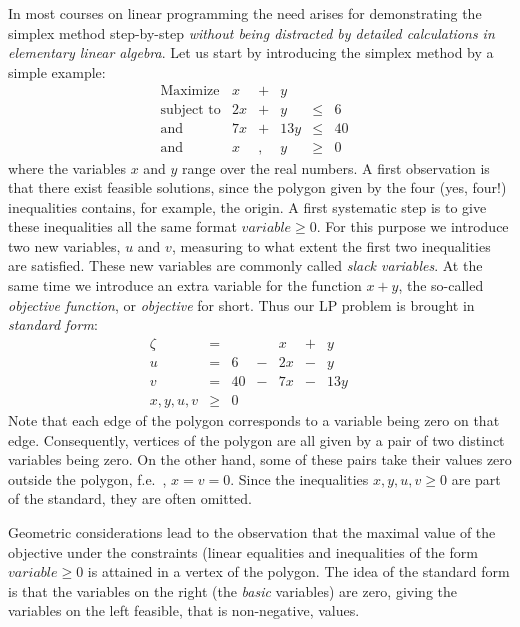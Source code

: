 \documentclass[ukenglish]{nik}
\begin{document}
In most courses on linear programming the need arises for demonstrating the simplex method step-by-step 
\emph{without being distracted by detailed calculations in elementary linear algebra}. Let us start by
introducing the simplex method by a simple example:
\[
    \begin{array}{llcrcrcrcrcrcr}
    \text{Maximize}  &    x &+&    y \\
    \text{subject to}&  2 x &+&    y &\leq&   6\\
    \text{and}&         7 x &+& 13 y &\leq&  40\\
    \text{and}       &    x &,&    y &\geq&0    &
    \end{array}
\]
where the variables $x$ and $y$ range over the real numbers.
A first observation is that there exist feasible solutions,
since the polygon given by the four (yes, four!) inequalities contains,
for example, the origin. A first systematic step is to give these inequalities
all the same format $\mathit{variable}\geq 0$. For this purpose we introduce
two new variables, $u$ and $v$, measuring to what extent the first
two inequalities are satisfied. These new variables are commonly called
\emph{slack variables}. At the same time we introduce an extra variable
for the function $x+y$, the so-called \emph{objective function},
or \emph{objective} for short. Thus our LP problem is brought in
\emph{standard form}:
\[    
    \begin{array}{lcrcrcrcr}
      \zeta&=&   & &     x &+&     y & &  \\\hline
      u    &=& 6 &-&   2 x &-&     y & &  \\
      v    &=& 40&-&   7 x &-&  13 y & &  \\
      x,y,u,v  &\geq&0     & &  & &  & &    
    \end{array}
\]
Note that each edge of the polygon corresponds to a variable
being zero on that edge. Consequently,
vertices of the polygon are all given by a pair of
two distinct variables being zero. On the other hand, some of these
pairs take their values zero outside the polygon, f.e.\ , $x=v=0$.
Since the inequalities $x,y,u,v \geq 0$ are part of the standard, 
they are often omitted. 

Geometric considerations lead to the observation that the
maximal value of the objective under the constraints (linear
equalities and inequalities of the form 
$\mathit{variable}\geq 0$ is attained in a vertex of the
polygon. The idea of the standard form is
that the variables on the right (the \emph{basic} variables) are zero,
giving the variables on the left feasible, that is non-negative, values.
\end{document}
